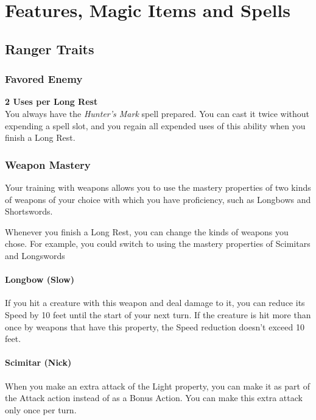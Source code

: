 \documentclass[letterpaper,openany,oneside,twocolumn]{book}
\begin{document}
\onecolumn


\rendercharactersheet

\renderbackgroundsheet

\renderspellsheet



\restoregeometry
\twocolumn

\chapter*{Features, Magic Items and Spells}

\section*{Ranger Traits}
\subsection*{Favored Enemy}
\textbf{2 Uses per Long Rest}\\
You always have the \textit{Hunter's Mark} spell prepared. You can cast it twice without expending a spell slot, and you regain all expended uses of this ability when you finish a Long Rest.
\subsection*{Weapon Mastery}
Your training with weapons allows you to use the mastery properties of two kinds of weapons of your choice with which you have proficiency, such as Longbows and Shortswords.

Whenever you finish a Long Rest, you can change the kinds of weapons you chose. For example, you could switch to using the mastery properties of Scimitars and Longswords
\subsubsection*{Longbow (Slow)}
If you hit a creature with this weapon and deal damage to it, you can reduce its Speed by 10 feet until the start of your next turn. If the creature is hit more than once by weapons that have this property, the Speed reduction doesn't exceed 10 feet.
\subsubsection*{Scimitar (Nick)}
When you make an extra attack of the Light property, you can make it as part of the Attack action instead of as a Bonus Action. You can make this extra attack only once per turn.
\end{document}
